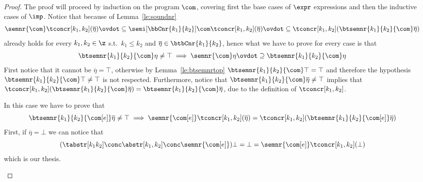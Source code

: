 \begin{proof}
  The proof will proceed by induction on the program \(\com\),
  covering first the base cases of \(\expr\) expressions and then the
  inductive cases of \(\imp\). Notice that because of
  Lemma~\ref{le:soundnr}
  \begin{equation*}
    \semnr{\com}\tconcr[k_1,k_2](\overline\eta)
    \ovdot\subseteq
    \semi[\bbCnr{k_1}{k_2}]{\com}\tconcr[k_1,k_2](\overline\eta)
    \ovdot\subseteq
    \tconcr[k_1,k_2](\btsemnr{k_1}{k_2}{\com}\overline\eta)
  \end{equation*}
  already holds for every \(k_1, k_2 \in \z\) s.t.\ \(k_1\leq k_2\)
  and \(\overline\eta \in \btbCnr{k_1}{k_2}\), hence what we have to
  prove for every case is that
  \begin{equation*}
    \btsemnr{k_1}{k_2}{\com}\eta \neq \top \implies \semnr{\com} \eta \ovdot\supseteq \btsemnr{k_1}{k_2}{\com}\eta
  \end{equation*}
  First notice that it cannot be \(\overline\eta = \top\), otherwise
  by Lemma~\ref{le:btsemnrtop} \(\btsemnr{k_1}{k_2}{\com}\top = \top\)
  and therefore the hypothesis
  \(\btsemnr{k_1}{k_2}{\com}\top \neq \top\) is not
  respected. Furthermore, notice that
  \(\btsemnr{k_1}{k_2}{\com}\overline\eta \neq \top\) implies that
  \(\tconcr[k_1,k_2](\btsemnr{k_1}{k_2}{\com}\overline\eta) =
  \btsemnr{k_1}{k_2}{\com}\overline\eta\), due to the definition of
  \(\tconcr[k_1,k_2]\).
  \begin{inductive}
    \case{\(\com[e]\)} In this case we have to prove that
    \begin{equation*}
      \btsemnr{k_1}{k_2}{\com[e]}\overline{\eta} \neq \top \implies
      \semnr{\com[e]}\tconcr[k_1,k_2](\overline\eta) = \tconcr[k_1,k_2](\btsemnr{k_1}{k_2}{\com[e]}\overline\eta)
    \end{equation*}
    First, if \(\overline\eta = \bot\) we can notice that
    \begin{equation*}
      (\tabstr[k_1k_2] \conc \abstr[k_1,k_2] \conc \semnr{\com[e]})\bot
      = \bot =
      \semnr{\com[e]}\tconcr[k_1,k_2](\bot)
    \end{equation*}
    which is our thesis.


\end{inductive}
\end{proof}

